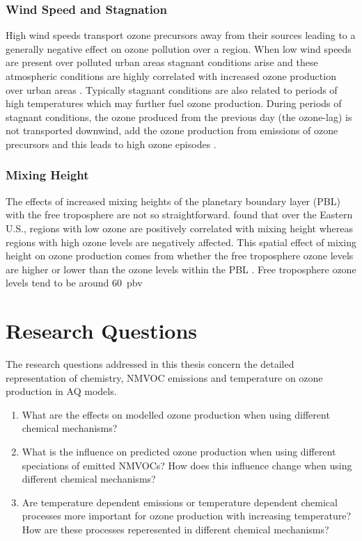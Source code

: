 \subsubsection{Wind Speed and Stagnation}
High wind speeds transport ozone precursors away from their sources leading to a generally negative effect on ozone pollution over a region.
When low wind speeds are present over polluted urban areas stagnant conditions arise and these atmospheric conditions are highly correlated with increased ozone production over urban areas \citep{Jacob:2009}.
Typically stagnant conditions are also related to periods of high temperatures which may further fuel ozone production.
During periods of stagnant conditions, the ozone produced from the previous day (the ozone-lag) is not transported downwind, add the ozone production from emissions of ozone precursors and this leads to high ozone episodes \citep{Jacob:2009}.

\subsubsection{Mixing Height}
The effects of increased mixing heights of the planetary boundary layer (PBL) with the free troposphere are not so straightforward.
\citet{Dawson:2007} found that over the Eastern U.S., regions with low ozone are positively correlated with mixing height whereas regions with high ozone levels are negatively affected.
This spatial effect of mixing height on ozone production comes from whether the free troposphere ozone levels are higher or lower than the ozone levels within the PBL \citep{Jacob:2009}.
Free troposphere ozone levels tend to be around $60$~pbv  %


\section{Research Questions} \label{s:research_questions}
The research questions addressed in this thesis concern the detailed representation of chemistry, NMVOC emissions and temperature on ozone production in AQ models.
\begin{enumerate}
	\item What are the effects on modelled ozone production when using different chemical mechanisms?
	\item What is the influence on predicted ozone production when using different speciations of emitted NMVOCs? How does this influence change when using different chemical mechanisms?
	\item Are temperature dependent emissions or temperature dependent chemical processes more important for ozone production with increasing temperature? How are these processes reperesented in different chemical mechanisms?
\end{enumerate}

